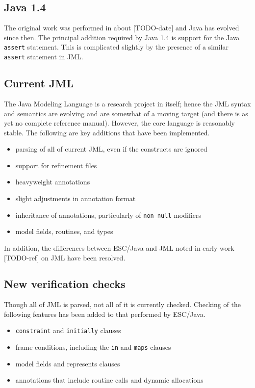 \documentclass{acm_proc_article-sp}
\begin{document}
\subsection{Java 1.4}
The original work was performed in about [TODO-date] and Java has evolved since then.
The principal addition required by Java 1.4
is support for the Java {\tt assert} statement.  This is 
complicated slightly by the presence of a similar {\tt assert} statement in JML.

\subsection{Current JML}
The Java Modeling Language is a research project in itself; hence the JML syntax
and semantics are evolving and are somewhat of a moving target (and there is as yet
no complete reference manual).  However, the core
language is reasonably stable.  The following are key additions that have been 
implemented.
\setlength{\partopsep}{0in}\setlength{\parskip}{0in}
\begin{itemize}\setlength{\itemsep}{0in}
\item parsing of all of current JML, even if the constructs are ignored
\item support for refinement files
\item heavyweight annotations
\item slight adjustments in annotation format
\item inheritance of annotations, particularly of {\tt non\_null} modifiers
\item model fields, routines, and types
\end{itemize}
In addition, the differences between ESC/Java and JML noted in early work [TODO-ref]
on JML have
been resolved.

\subsection{New verification checks}
Though all of JML is parsed, not all of it is currently checked.  Checking of the
following features has been added to that performed by ESC/Java.
\setlength{\partopsep}{0in}\setlength{\parskip}{0in}
\begin{itemize}\setlength{\itemsep}{0in}
\item {\tt constraint} and {\tt initially} clauses
\item frame conditions, including the {\tt in} and {\tt maps} clauses
\item model fields and represents clauses
\item annotations that include routine calls and dynamic allocations
\end{itemize}
\end{document}
